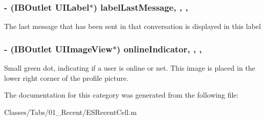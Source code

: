 \subsubsection[{label\+Last\+Message}]{\setlength{\rightskip}{0pt plus 5cm}-\/ (I\+B\+Outlet U\+I\+Label$\ast$) label\+Last\+Message\hspace{0.3cm}{\ttfamily [read]}, {\ttfamily [write]}, {\ttfamily [nonatomic]}, {\ttfamily [strong]}}\label{category_e_s_recent_cell_07_08_a88a3b6916e4e963618de5cc159ffc675}
The last message that has been sent in that conversation is displayed in this label \hypertarget{category_e_s_recent_cell_07_08_a8a1973c8e2b5e6709d700ac30daed557}{}
\subsubsection[{online\+Indicator}]{\setlength{\rightskip}{0pt plus 5cm}-\/ (I\+B\+Outlet U\+I\+Image\+View$\ast$) online\+Indicator\hspace{0.3cm}{\ttfamily [read]}, {\ttfamily [write]}, {\ttfamily [nonatomic]}, {\ttfamily [strong]}}\label{category_e_s_recent_cell_07_08_a8a1973c8e2b5e6709d700ac30daed557}
Small green dot, indicating if a user is online or net. This image is placed in the lower right corner of the profile picture. 

The documentation for this category was generated from the following file\+:\begin{DoxyCompactItemize}
\item 
Classes/\+Tabs/01\+\_\+\+Recent/E\+S\+Recent\+Cell.\+m\end{DoxyCompactItemize}
